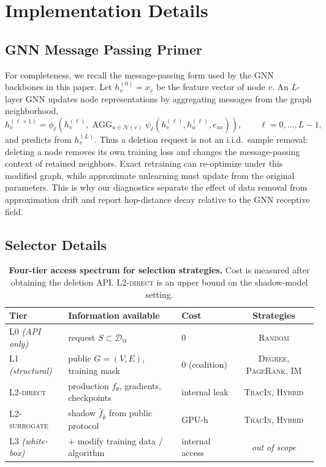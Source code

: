\section{Implementation Details}
\label{app:impl}

\subsection{GNN Message Passing Primer}
\label{app:gnn-primer}
For completeness, we recall the message-passing form used by the GNN
backbones in this paper. Let $h_v^{(0)}=x_v$ be the feature vector of
node $v$. An $L$-layer GNN updates node representations by aggregating
messages from the graph neighborhood,
\begin{equation}
h_v^{(\ell+1)}
= \phi_\ell\!\left(h_v^{(\ell)},
  \operatorname{AGG}_{u\in\mathcal{N}(v)}
  \psi_\ell(h_v^{(\ell)},h_u^{(\ell)},e_{uv})\right),
\qquad \ell=0,\ldots,L-1,
\end{equation}
and predicts from $h_v^{(L)}$. Thus a deletion request is not an
i.i.d.\ sample removal: deleting a node removes its own training loss
and changes the message-passing context of retained neighbors. Exact
retraining can re-optimize under this modified graph, while approximate
unlearning must update from the original parameters. This is why our
diagnostics separate the effect of data removal from approximation drift
and report hop-distance decay relative to the GNN receptive field.

\subsection{Selector Details}
\label{app:selectors}

\begin{table}[h]
\centering
\scriptsize
\caption{\textbf{Four-tier access spectrum for selection strategies.}
Cost is measured after obtaining the deletion API. L2-\textsc{direct}
is an upper bound on the shadow-model setting.}
\label{tab:access}
\begin{tabular}{@{}lllc@{}}
\toprule
Tier & Information available & Cost & Strategies \\
\midrule
L0 \emph{(API only)}       & request $S\subset\mathcal{D}_{\mathrm{tr}}$        & $0$             & \textsc{Random} \\
L1 \emph{(structural)}     & public $G=(V,E)$, training mask                    & $0$ (coalition) & \textsc{Degree}, \textsc{PageRank}, \textsc{IM} \\
L2-\textsc{direct}         & production $f_\theta$, gradients, checkpoints      & internal leak   & \textsc{TracIn}, \textsc{Hybrid} \\
L2-\textsc{surrogate}      & shadow $\hat f_{\hat\theta}$ from public protocol  & GPU-h           & \textsc{TracIn}, \textsc{Hybrid} \\
L3 \emph{(white-box)}      & + modify training data / algorithm                 & internal access & \emph{out of scope} \\
\bottomrule
\end{tabular}
\end{table}

